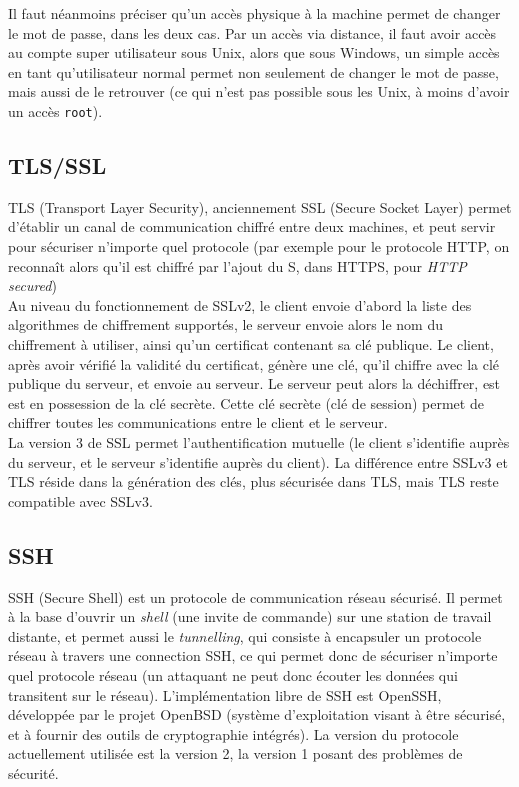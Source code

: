 Il faut néanmoins préciser qu'un accès physique à la machine
permet de changer le mot de passe, dans les deux cas. Par un accès
via distance, il faut avoir accès au compte super utilisateur sous
Unix, alors que sous Windows, un simple accès en tant
qu'utilisateur normal permet non seulement de changer le mot de
passe, mais aussi de le retrouver (ce qui n'est pas possible sous
les Unix, à moins d'avoir un accès \texttt{root}).
\subsection{TLS/SSL}
TLS (Transport Layer Security), anciennement SSL (Secure Socket
Layer) permet d'établir un canal de communication chiffré entre
deux machines, et peut servir pour sécuriser n'importe quel
protocole (par exemple pour le protocole HTTP, on reconnaît alors qu'il
est chiffré par l'ajout du S, dans HTTPS, pour \emph{HTTP
secured})
\\
 
Au niveau du fonctionnement de SSLv2, le client envoie d'abord la liste des
algorithmes de chiffrement supportés, le serveur envoie alors le
nom du chiffrement à utiliser, ainsi qu'un
certificat contenant sa clé publique. Le client, après avoir
vérifié la validité du certificat, génère une clé, qu'il
chiffre avec la clé publique du serveur, et envoie au serveur.
Le serveur peut alors la déchiffrer, est est
en possession de la clé secrète.
Cette clé secrète (clé de session) permet de chiffrer toutes les
communications entre le client et le serveur.
\\

La version 3 de SSL permet l'authentification mutuelle (le client
s'identifie auprès du serveur, et le serveur s'identifie auprès du
client). La différence entre SSLv3 et TLS réside dans la
génération des clés, plus sécurisée dans TLS, mais TLS reste
compatible avec SSLv3.

\subsection{SSH}
SSH (Secure Shell) est un protocole de communication réseau
sécurisé. Il permet à la base d'ouvrir un \emph{shell} (une invite
de commande) sur une station de travail distante, et permet aussi
le \emph{tunnelling}, qui consiste à encapsuler un protocole
réseau à travers une connection SSH, ce qui permet donc de
sécuriser n'importe quel protocole réseau (un attaquant ne peut
donc écouter les données qui transitent sur le réseau).
L'implémentation libre de SSH est OpenSSH, développée par le
projet OpenBSD (système d'exploitation visant à être sécurisé, et
à fournir des outils de cryptographie intégrés). La version 
du protocole
actuellement utilisée est la version 2, la version 1 posant des
problèmes de sécurité.
\\

